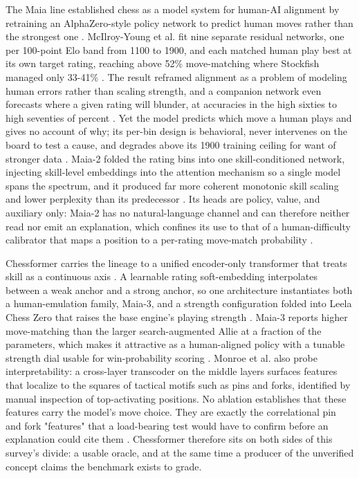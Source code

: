 \documentclass[conference]{IEEEtran}
\begin{document}
The Maia line established chess as a model system for human-AI alignment by retraining an AlphaZero-style policy network to predict human moves rather than the strongest one \cite{ref20}. McIlroy-Young et al. fit nine separate residual networks, one per 100-point Elo band from 1100 to 1900, and each matched human play best at its own target rating, reaching above 52\% move-matching where Stockfish managed only 33-41\% \cite{ref20}. The result reframed alignment as a problem of modeling human errors rather than scaling strength, and a companion network even forecasts where a given rating will blunder, at accuracies in the high sixties to high seventies of percent \cite{ref20}. Yet the model predicts which move a human plays and gives no account of why; its per-bin design is behavioral, never intervenes on the board to test a cause, and degrades above its 1900 training ceiling for want of stronger data \cite{ref20}. Maia-2 folded the rating bins into one skill-conditioned network, injecting skill-level embeddings into the attention mechanism so a single model spans the spectrum, and it produced far more coherent monotonic skill scaling and lower perplexity than its predecessor \cite{ref9}. Its heads are policy, value, and auxiliary only: Maia-2 has no natural-language channel and can therefore neither read nor emit an explanation, which confines its use to that of a human-difficulty calibrator that maps a position to a per-rating move-match probability \cite{ref9}.

Chessformer carries the lineage to a unified encoder-only transformer that treats skill as a continuous axis \cite{ref8}. A learnable rating soft-embedding interpolates between a weak anchor and a strong anchor, so one architecture instantiates both a human-emulation family, Maia-3, and a strength configuration folded into Leela Chess Zero that raises the base engine's playing strength \cite{ref8}. Maia-3 reports higher move-matching than the larger search-augmented Allie at a fraction of the parameters, which makes it attractive as a human-aligned policy with a tunable strength dial usable for win-probability scoring \cite{ref8}. Monroe et al. also probe interpretability: a cross-layer transcoder on the middle layers surfaces features that localize to the squares of tactical motifs such as pins and forks, identified by manual inspection of top-activating positions. No ablation establishes that these features carry the model's move choice. They are exactly the correlational pin and fork "features" that a load-bearing test would have to confirm before an explanation could cite them \cite{ref8}. Chessformer therefore sits on both sides of this survey's divide: a usable oracle, and at the same time a producer of the unverified concept claims the benchmark exists to grade.
\end{document}
